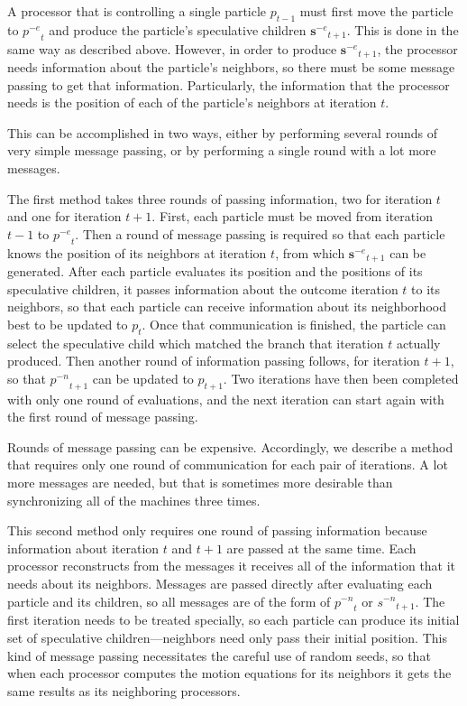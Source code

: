 \documentclass[conference,letterpaper]{IEEEtran}
\providecommand{\noeval}[1]{\ensuremath{#1^{-e}}}
\providecommand{\nonbest}[1]{\ensuremath{#1^{-n}}}
\providecommand{\p}{\ensuremath{p}}
\providecommand{\s}{\ensuremath{s}}
\providecommand{\sset}{\ensuremath{\mathbf{s}}}
\begin{document}
A processor that is controlling a single particle $\p_{t-1}$ must first move
the particle to $\noeval{\p}_t$ and produce the particle's speculative children
$\noeval{\sset}_{t+1}$.  This is done in the same way as described above.
However, in order to produce $\noeval{\sset}_{t+1}$, the processor needs
information about the particle's neighbors, so there must be some message
passing to get that information.  Particularly, the information that the
processor needs is the position of each of the particle's neighbors at
iteration $t$.

This can be accomplished in two ways, either by performing several rounds of
very simple message passing, or by performing a single round with a lot more
messages.

The first method takes three rounds of passing information, two for iteration
$t$ and one for iteration $t+1$.  First, each particle must be moved from
iteration $t-1$ to $\noeval{\p}_t$.  Then a round of message passing is
required so that each particle knows the position of its neighbors at iteration
$t$, from which $\noeval{\sset}_{t+1}$ can be generated.  After each particle
evaluates its position and the positions of its speculative children, it passes
information about the outcome iteration $t$ to its neighbors, so that each
particle can receive information about its neighborhood best to be updated to
$\p_t$.  Once that communication is finished, the particle can select the
speculative child which matched the branch that iteration $t$ actually
produced.  Then another round of information passing follows, for iteration
$t+1$, so that $\nonbest{\p}_{t+1}$ can be updated to $\p_{t+1}$.  Two
iterations have then been completed with only one round of evaluations, and the
next iteration can start again with the first round of message passing.

Rounds of message passing can be expensive.  Accordingly, we describe a method
that requires only one round of communication for each pair of iterations.  A
lot more messages are needed, but that is sometimes more desirable than
synchronizing all of the machines three times.

This second method only requires one round of passing information because
information about iteration $t$ and $t+1$ are passed at the same time.  Each
processor reconstructs from the messages it receives all of the information
that it needs about its neighbors.  Messages are passed directly after
evaluating each particle and its children, so all messages are of the form of
$\nonbest{\p}_t$ or $\nonbest{\s}_{t+1}$.  The first iteration needs to be
treated specially, so each particle can produce its initial set of speculative
children---neighbors need only pass their initial position.  This kind of
message passing necessitates the careful use of random seeds, so that when each
processor computes the motion equations for its neighbors it gets the same
results as its neighboring processors.
\end{document}
